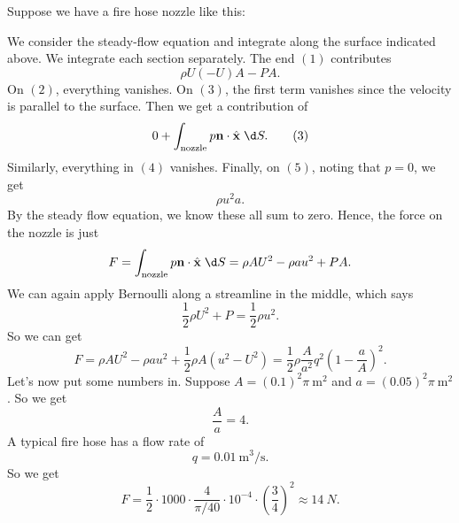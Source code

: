 \documentclass[a4paper]{article}
\begin{document}
\begin{eg}
  Suppose we have a fire hose nozzle like this:
  \begin{center}
  \end{center}
  We consider the steady-flow equation and integrate along the surface indicated above. We integrate each section separately. The end $(1)$ contributes
  \[
    \rho U(-U)A - PA.
  \]
  On $(2)$, everything vanishes. On $(3)$, the first term vanishes since the velocity is parallel to the surface. Then we get a contribution of
  \[
    0 + \int_{\mathrm{nozzle}} p \mathbf{n}\cdot \hat{\mathbf{x}}\;\d S.\tag{3}
  \]
  Similarly, everything in $(4)$ vanishes. Finally, on $(5)$, noting that $p = 0$, we get
  \[
    \rho u^2 a.
  \]
  By the steady flow equation, we know these all sum to zero. Hence, the force on the nozzle is just
  \[
    F = \int_{\mathrm{nozzle}} p\mathbf{n}\cdot \hat{\mathbf{x}}\;\d S = \rho AU^2 - \rho au^2 + PA.
  \]
  We can again apply Bernoulli along a streamline in the middle, which says
  \[
    \frac{1}{2}\rho U^2 + P = \frac{1}{2} \rho u^2.
  \]
  So we can get
  \[
    F = \rho AU^2 - \rho au^2 + \frac{1}{2} \rho A(u^2 - U^2) = \frac{1}{2} \rho\frac{A}{a^2}q^2 \left(1 - \frac{a}{A}\right)^2.
  \]
  Let's now put some numbers in. Suppose $A = (0.1)^2 \pi\SI{}{\meter\squared}$ and $a = (0.05)^2 \pi\SI{}{\meter\squared}$. So we get
  \[
    \frac{A}{a} = 4.
  \]
  A typical fire hose has a flow rate of
  \[
    q = \SI{0.01}{\meter\cubed\per\second}.
  \]
  So we get
  \[
    F = \frac{1}{2} \cdot 1000 \cdot \frac{4}{\pi/40} \cdot 10^{-4} \cdot \left(\frac{3}{4}\right)^2 \approx \SI{14}{N}.
  \]
\end{eg}
\end{document}
